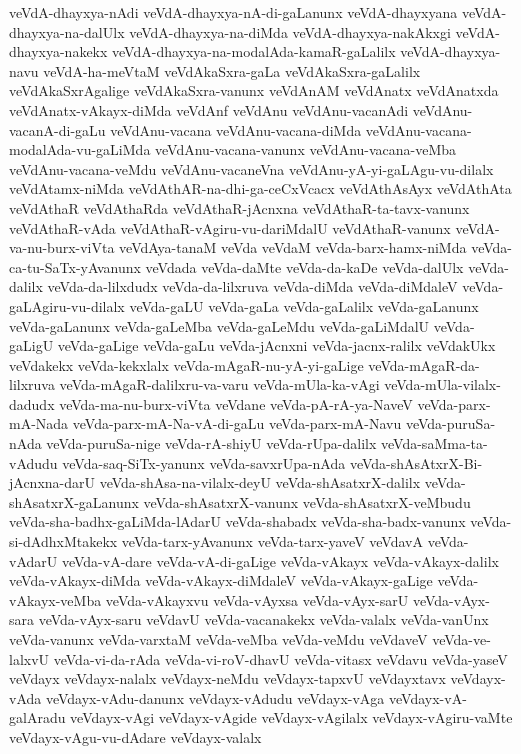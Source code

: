 {veVdA-dhayxya-nAdi
veVdA-dhayxya-nA-di-gaLanunx
veVdA-dhayxyana
veVdA-dhayxya-na-dalUlx
veVdA-dhayxya-na-diMda
veVdA-dhayxya-nakAkxgi
veVdA-dhayxya-nakekx
veVdA-dhayxya-na-modalAda-kamaR-gaLalilx
veVdA-dhayxya-navu
veVdA-ha-meVtaM
veVdAkaSxra-gaLa
veVdAkaSxra-gaLalilx
veVdAkaSxrAgalige
veVdAkaSxra-vanunx
veVdAnAM
veVdAnatx
veVdAnatxda
veVdAnatx-vAkayx-diMda
veVdAnf
veVdAnu
veVdAnu-vacanAdi
veVdAnu-vacanA-di-gaLu
veVdAnu-vacana
veVdAnu-vacana-diMda
veVdAnu-vacana-modalAda-vu-gaLiMda
veVdAnu-vacana-vanunx
veVdAnu-vacana-veMba
veVdAnu-vacana-veMdu
veVdAnu-vacaneVna
veVdAnu-yA-yi-gaLAgu-vu-dilalx
veVdAtamx-niMda
veVdAthAR-na-dhi-ga-ceCxVcacx
veVdAthAsAyx
veVdAthAta
veVdAthaR
veVdAthaRda
veVdAthaR-jAcnxna
veVdAthaR-ta-tavx-vanunx
veVdAthaR-vAda
veVdAthaR-vAgiru-vu-dariMdalU
veVdAthaR-vanunx
veVdA-va-nu-burx-viVta
veVdAya-tanaM
veVda
veVdaM
veVda-barx-hamx-niMda
veVda-ca-tu-SaTx-yAvanunx
veVdada
veVda-daMte
veVda-da-kaDe
veVda-dalUlx
veVda-dalilx
veVda-da-lilxdudx
veVda-da-lilxruva
veVda-diMda
veVda-diMdaleV
veVda-gaLAgiru-vu-dilalx
veVda-gaLU
veVda-gaLa
veVda-gaLalilx
veVda-gaLanunx
veVda-gaLanunx
veVda-gaLeMba
veVda-gaLeMdu
veVda-gaLiMdalU
veVda-gaLigU
veVda-gaLige
veVda-gaLu
veVda-jAcnxni
veVda-jacnx-ralilx
veVdakUkx
veVdakekx
veVda-kekxlalx
veVda-mAgaR-nu-yA-yi-gaLige
veVda-mAgaR-da-lilxruva
veVda-mAgaR-dalilxru-va-varu
veVda-mUla-ka-vAgi
veVda-mUla-vilalx-dadudx
veVda-ma-nu-burx-viVta
veVdane
veVda-pA-rA-ya-NaveV
veVda-parx-mA-Nada
veVda-parx-mA-Na-vA-di-gaLu
veVda-parx-mA-Navu
veVda-puruSa-nAda
veVda-puruSa-nige
veVda-rA-shiyU
veVda-rUpa-dalilx
veVda-saMma-ta-vAdudu
veVda-saq-SiTx-yanunx
veVda-savxrUpa-nAda
veVda-shAsAtxrX-Bi-jAcnxna-darU
veVda-shAsa-na-vilalx-deyU
veVda-shAsatxrX-dalilx
veVda-shAsatxrX-gaLanunx
veVda-shAsatxrX-vanunx
veVda-shAsatxrX-veMbudu
veVda-sha-badhx-gaLiMda-lAdarU
veVda-shabadx
veVda-sha-badx-vanunx
veVda-si-dAdhxMtakekx
veVda-tarx-yAvanunx
veVda-tarx-yaveV
veVdavA
veVda-vAdarU
veVda-vA-dare
veVda-vA-di-gaLige
veVda-vAkayx
veVda-vAkayx-dalilx
veVda-vAkayx-diMda
veVda-vAkayx-diMdaleV
veVda-vAkayx-gaLige
veVda-vAkayx-veMba
veVda-vAkayxvu
veVda-vAyxsa
veVda-vAyx-sarU
veVda-vAyx-sara
veVda-vAyx-saru
veVdavU
veVda-vacanakekx
veVda-valalx
veVda-vanUnx
veVda-vanunx
veVda-varxtaM
veVda-veMba
veVda-veMdu
veVdaveV
veVda-ve-lalxvU
veVda-vi-da-rAda
veVda-vi-roV-dhavU
veVda-vitasx
veVdavu
veVda-yaseV
veVdayx
veVdayx-nalalx
veVdayx-neMdu
veVdayx-tapxvU
veVdayxtavx
veVdayx-vAda
veVdayx-vAdu-danunx
veVdayx-vAdudu
veVdayx-vAga
veVdayx-vA-galAradu
veVdayx-vAgi
veVdayx-vAgide
veVdayx-vAgilalx
veVdayx-vAgiru-vaMte
veVdayx-vAgu-vu-dAdare
veVdayx-valalx
}

